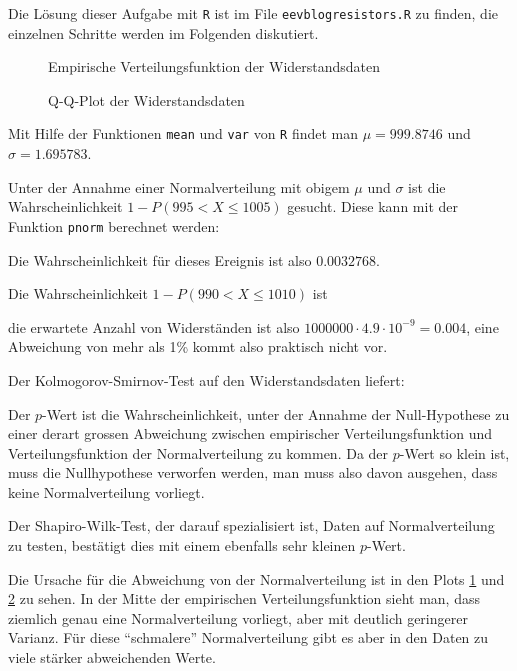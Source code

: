 \begin{loesung}
Die Lösung dieser Aufgabe mit {\tt R} ist im File {\tt eevblogresistors.R}
zu finden, die einzelnen Schritte werden im Folgenden diskutiert.
\begin{figure}
\begin{center}
\end{center}
\caption{Empirische Verteilungsfunktion der Widerstandsdaten\label{80000020-ecdf}}
\end{figure}
\begin{figure}
\begin{center}
\end{center}
\caption{Q-Q-Plot der Widerstandsdaten\label{80000020-qq}}
\end{figure}
\begin{teilaufgaben}
\item
Mit Hilfe der Funktionen {\tt mean} und {\tt var} von {\tt R} findet man
$\mu= 999.8746$ und $\sigma= 1.695783$.
\item
Unter der Annahme einer Normalverteilung mit obigem $\mu$ und $\sigma$
ist die Wahrscheinlichkeit
$1-P(995 < X \le 1005)$ gesucht.
Diese kann mit der Funktion {\tt pnorm} berechnet werden:
\begin{small}
\end{small}
Die Wahrscheinlichkeit für dieses Ereignis ist also $0.0032768$.
\item
Die Wahrscheinlichkeit $1-P(990 < X \le 1010)$ ist 
\begin{small}
\end{small}
die erwartete Anzahl von Widerständen ist also
$1000000 \cdot 4.9\cdot 10^{-9}=0.004$, eine Abweichung von mehr als 1\%
kommt also praktisch nicht vor.
\item
Der Kolmogorov-Smirnov-Test auf den Widerstandsdaten liefert:
\begin{small}
\end{small}
Der $p$-Wert ist die Wahrscheinlichkeit, unter der Annahme der Null-Hypothese
zu einer derart grossen Abweichung zwischen empirischer Verteilungsfunktion
und Verteilungsfunktion der Normalverteilung zu kommen. Da der $p$-Wert
so klein ist, muss die Nullhypothese verworfen werden, man muss also davon
ausgehen, dass keine Normalverteilung vorliegt.

Der Shapiro-Wilk-Test, der darauf spezialisiert ist, Daten auf Normalverteilung
zu testen, bestätigt dies mit einem ebenfalls sehr kleinen $p$-Wert.
\begin{small}
\end{small}

Die Ursache für die Abweichung von der Normalverteilung ist in den Plots
\ref{80000020-ecdf} und \ref{80000020-qq} zu
sehen. In der Mitte der empirischen Verteilungsfunktion sieht man, dass
ziemlich genau eine Normalverteilung vorliegt, aber mit deutlich
geringerer Varianz.
Für diese ``schmalere'' Normalverteilung gibt es aber in den Daten
zu viele stärker abweichenden Werte.
\end{teilaufgaben}
\end{loesung}

